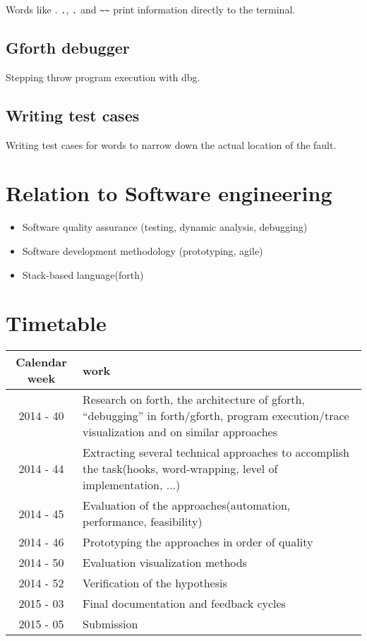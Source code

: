 Words like \emph{.} \texttt{.}, \texttt{.\textquotedbl} and \texttt{\textasciitilde\textasciitilde} print information directly to the terminal.

\subsection{Gforth debugger}

Stepping throw program execution with dbg.

\subsection{Writing test cases}

Writing test cases for words to narrow down the actual location of the fault.

\section{Relation to Software engineering}

\begin{itemize}
	\item Software quality assurance (testing, dynamic analysis, debugging)
	\item Software development methodology (prototyping, agile)
	\item Stack-based language(forth)
\end{itemize}

\section{Timetable}

\begin{center}
    \begin{tabular}{ | c | p{11cm} |}
    \hline
    Calendar week & work \\ \hline
    2014 - 40 & Research on forth, the architecture of gforth, ``debugging'' in forth/gforth,  program execution/trace visualization and on similar approaches \\ \hline
    2014 - 44 & Extracting several technical approaches to accomplish the task(hooks, word-wrapping, level of implementation, ...) \\ \hline
    2014 - 45 & Evaluation of the approaches(automation, performance, feasibility) \\ \hline
    2014 - 46 & Prototyping the approaches in order of quality \\ \hline
	  2014 - 50 & Evaluation visualization methods \\ \hline
    2014 - 52 & Verification of the hypothesis \\ \hline
    2015 - 03 & Final documentation and feedback cycles \\ \hline
    2015 - 05 & Submission \\
    \hline
    \end{tabular}
\end{center}


